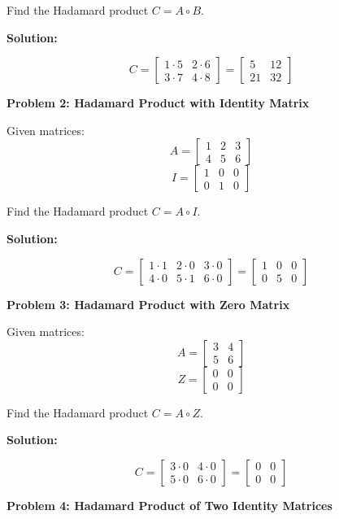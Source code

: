 \documentclass[
  letterpaper,
  DIV=11,
  numbers=noendperiod]{scrreprt}
\theoremstyle{plain}
\theoremstyle{definition}
\theoremstyle{remark}
\begin{document}
Find the Hadamard product \(C=A\circ B\).

\textbf{Solution:}

\[C=\begin{bmatrix}1\cdot 5&2\cdot 6\\3\cdot7&4\cdot 8 \end{bmatrix}=\begin{bmatrix}5&12\\21&32\end{bmatrix}\]

\textbf{Problem 2: Hadamard Product with Identity Matrix}

Given matrices: \[A=\begin{bmatrix}1&2&3\\4&5&6\end{bmatrix}\]
\[I=\begin{bmatrix}1&0&0\\0&1&0\end{bmatrix}\]

Find the Hadamard product \(C=A\circ I\).

\textbf{Solution:}

\[C=\begin{bmatrix}1\cdot1&2\cdot 0&3\cdot 0\\4\cdot 0&5\cdot 1&6\cdot 0 \end{bmatrix}= \begin{bmatrix} 1&0&0\\0&5&0\end{bmatrix}\]

\textbf{Problem 3: Hadamard Product with Zero Matrix}

Given matrices: \[A=\begin{bmatrix}3&4\\5&6\end{bmatrix}\]
\[Z=\begin{bmatrix}0&0\\0&0\end{bmatrix}\]

Find the Hadamard product \(C=A\circ Z\).

\textbf{Solution:}

\[C=\begin{bmatrix}3\cdot 0&4\cdot 0\\ 5\cdot 0&6\cdot 0 \end{bmatrix}=\begin{bmatrix}0&0\\0&0\end{bmatrix}\]

\textbf{Problem 4: Hadamard Product of Two Identity Matrices}
\end{document}

